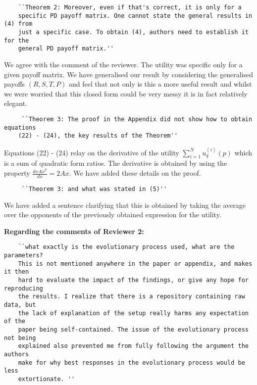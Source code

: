 \documentclass{article}
\begin{document}
\begin{verbatim}
    ``Theorem 2: Moreover, even if that's correct, it is only for a
    specific PD payoff matrix. One cannot state the general results in (4) from
    just a specific case. To obtain (4), authors need to establish it for the
    general PD payoff matrix.''
\end{verbatim}

We agree with the comment of the reviewer. The utility was
specific only for a given payoff matrix. We have generalised our result by
considering the generalised payoffs \((R, S, T, P)\) and feel that not only is this a more useful
result and whilst we were worried that this closed form could be very messy it is in fact relatively elegant.

\begin{verbatim}
     ``Theorem 3: The proof in the Appendix did not show how to obtain equations
    (22) - (24), the key results of the Theorem''
\end{verbatim}

Equations (22) - (24) relay on the derivative of the utility \(\sum\limits_{i=1}
^ N  u_q^{(i)}(p)\) which is a sum of quadratic form ratios. The derivative is
obtained by using the property \(\frac{d x A x^T}{dx} =  2Ax\). We have added
these details on the proof.
\begin{verbatim}
     ``Theorem 3: and what was stated in (5)''
\end{verbatim}

We have added a sentence clarifying that this is obtained by taking the average
over the opponents of the previously obtained expression for the utility.

\textbf{Regarding the comments of Reviewer 2:}

\begin{verbatim}
    ``what exactly is the evolutionary process used, what are the parameters?
    This is not mentioned anywhere in the paper or appendix, and makes it then
    hard to evaluate the impact of the findings, or give any hope for reproducing
    the results. I realize that there is a repository containing raw data, but
    the lack of explanation of the setup really harms any expectation of the
    paper being self-contained. The issue of the evolutionary process not being
    explained also prevented me from fully following the argument the authors
    make for why best responses in the evolutionary process would be less
    extortionate. ''
\end{verbatim}
\end{document}
